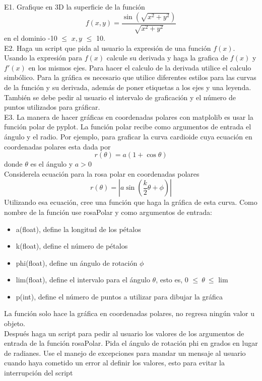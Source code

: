 \documentclass[12pt,letterpaper]{report}
\author{Andrés Limón Cruz }
\begin{document}
E1. Grafique en 3D la superficie de la función
$$
f(x,y) = \dfrac{\sin(\sqrt{x^2+y^2})}{\sqrt{x^2+y^2}}
$$
en el dominio -10 $\leq$ $x,y$ $\leq$ 10.\\

E2. Haga un script que pida al usuario la expresión de una función $f(x)$. Usando la expresión para $f(x)$ calcule su derivada y haga la grafica de $f(x)$ y $f'(x)$ en los mismos ejes. Para hacer el calculo de la derivada utilice el calculo simbólico. Para la gráfica es necesario que utilice diferentes estilos para las curvas de la función y su derivada, además de poner etiquetas a los ejes y una leyenda. También se debe pedir al usuario el intervalo de graficación y el número de puntos utilizados para gráficar.\\

E3. La manera de hacer gráficas en coordenadas polares con matplolib es usar la función polar de pyplot. La función polar recibe como argumentos de entrada el ángulo y el radio. Por ejemplo, para graficar la curva cardioide cuya ecuación en coordenadas polares esta dada por
$$
r( \theta) = a(1+ \cos \theta )
$$
donde $\theta$ es el ángulo y $a > 0$\\
Considerela ecuación para la rosa polar en coordenadas polares
$$
r( \theta) = \left| a \sin \left( \frac{k}{2} \theta + \phi \right) \right|
$$
Utilizando esa ecuación, cree una función que haga la gráfica de esta curva. Como nombre de la función use rosaPolar y como argumentos de entrada:
\begin{itemize}
\item a(float), define la longitud de los pétalos
\item k(float), define el número de pétalos
\item phi(float), define un ángulo de rotación $\phi$
\item lim(float), define el intervalo para el ángulo $\theta$, esto es, 0 $\leq ~ \theta ~ \leq$ lim
\item p(int), define el número de puntos a utilizar para dibujar la gráfica
\end{itemize}
La función solo hace la gráfica en coordenadas polares, no regresa ningún valor u objeto.\\
Después haga un script para pedir al usuario los valores de los argumentos de entrada de la función rosaPolar. Pida el ángulo de rotación phi en grados en lugar de radianes. Use el manejo de excepciones para mandar un mensaje al usuario cuando haya cometido un error al definir los valores, esto para evitar la interrupción del script
\end{document}
